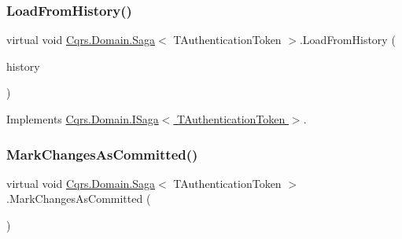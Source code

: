 \mbox{\label{classCqrs_1_1Domain_1_1Saga_a6029fc09445e2093f7fb40e304a04ff8_a6029fc09445e2093f7fb40e304a04ff8}} 
\subsubsection{\texorpdfstring{Load\+From\+History()}{LoadFromHistory()}}
{\footnotesize\ttfamily virtual void \hyperlink{classCqrs_1_1Domain_1_1Saga}{Cqrs.\+Domain.\+Saga}$<$ T\+Authentication\+Token $>$.Load\+From\+History (\begin{DoxyParamCaption}\item[{I\+Enumerable$<$ \hyperlink{interfaceCqrs_1_1Events_1_1ISagaEvent}{I\+Saga\+Event}$<$ T\+Authentication\+Token $>$$>$}]{history }\end{DoxyParamCaption})\hspace{0.3cm}{\ttfamily [virtual]}}



Implements \hyperlink{interfaceCqrs_1_1Domain_1_1ISaga_a2714804684bc65cf4dec79b4697b9b21_a2714804684bc65cf4dec79b4697b9b21}{Cqrs.\+Domain.\+I\+Saga$<$ T\+Authentication\+Token $>$}.

\mbox{\label{classCqrs_1_1Domain_1_1Saga_a9caac842ea6e88d6e502b63ca1820fe4_a9caac842ea6e88d6e502b63ca1820fe4}} 
\subsubsection{\texorpdfstring{Mark\+Changes\+As\+Committed()}{MarkChangesAsCommitted()}}
{\footnotesize\ttfamily virtual void \hyperlink{classCqrs_1_1Domain_1_1Saga}{Cqrs.\+Domain.\+Saga}$<$ T\+Authentication\+Token $>$.Mark\+Changes\+As\+Committed (\begin{DoxyParamCaption}{ }\end{DoxyParamCaption})\hspace{0.3cm}{\ttfamily [virtual]}}



